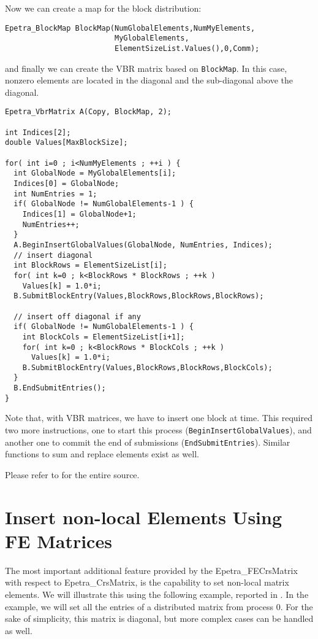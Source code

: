 Now we can create a map for the block distribution:
\begin{verbatim}
Epetra_BlockMap BlockMap(NumGlobalElements,NumMyElements,
                         MyGlobalElements, 
                         ElementSizeList.Values(),0,Comm);
\end{verbatim}
and finally we can create the VBR matrix based on \verb!BlockMap!. In
this case, nonzero elements are located in the diagonal and the
sub-diagonal above the diagonal.
\begin{verbatim}
Epetra_VbrMatrix A(Copy, BlockMap, 2);

int Indices[2];
double Values[MaxBlockSize];

for( int i=0 ; i<NumMyElements ; ++i ) {
  int GlobalNode = MyGlobalElements[i];
  Indices[0] = GlobalNode;
  int NumEntries = 1;
  if( GlobalNode != NumGlobalElements-1 ) {
    Indices[1] = GlobalNode+1;
    NumEntries++;
  }
  A.BeginInsertGlobalValues(GlobalNode, NumEntries, Indices);
  // insert diagonal
  int BlockRows = ElementSizeList[i];
  for( int k=0 ; k<BlockRows * BlockRows ; ++k )
    Values[k] = 1.0*i;
  B.SubmitBlockEntry(Values,BlockRows,BlockRows,BlockRows);

  // insert off diagonal if any
  if( GlobalNode != NumGlobalElements-1 ) {
    int BlockCols = ElementSizeList[i+1];
    for( int k=0 ; k<BlockRows * BlockCols ; ++k )
      Values[k] = 1.0*i;
    B.SubmitBlockEntry(Values,BlockRows,BlockRows,BlockCols);
  }
  B.EndSubmitEntries();
}
\end{verbatim}
Note that, with VBR matrices, we have to insert one block at time.  This
required two more instructions, one to start this process
(\verb!BeginInsertGlobalValues!), and another one to commit the end of
submissions (\verb!EndSubmitEntries!). Similar functions to sum and
replace elements exist as well.
 
\smallskip

Please refer to  for the entire source.


\section{Insert non-local Elements Using FE Matrices}
\label{sec:fematrix}

The most important additional feature provided by the
Epetra\_FECrsMatrix with respect to Epetra\_CrsMatrix, is the capability
to set non-local matrix elements. We will illustrate this using the
following example, reported in \newline {}. In the
example, we will set all the entries of a distributed matrix from
process 0. For the sake of simplicity, this matrix is diagonal, but more
complex cases can be handled as well.

